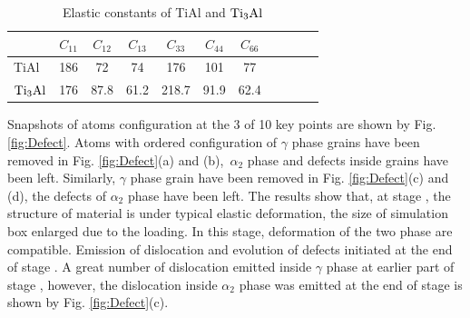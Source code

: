 \documentclass[materials,article,submit,moreauthors,pdftex,10pt,a4paper]{Definitions/mdpi}
\begin{document}
\begin{table}[ht]
	\caption{Elastic constants of TiAl and $\rm{Ti_3Al}$}
	\centering
	\begin{tabular}{l c c c c c c c c c c}
		\toprule
		\textbf{ } &$C_{11}$ &$C_{12}$ &$C_{13}$ &$C_{33}$ &$C_{44}$ &$C_{66}$\\		 
		\midrule
		TiAl\cite{Schwarz1995} &186 &72 &74 & 176 &101 &77	 \\
		\midrule
		$\rm{Ti_3Al}$\cite{Tanaka1996}	& 176 &  87.8 & 61.2 & 218.7 & 91.9 & 62.4   \\
		\bottomrule
	\end{tabular} 
	\label{tab:elastic}
\end{table}
Snapshots of atoms configuration at the 3 of 10 key points are shown by Fig. \ref{fig:Defect}.  Atoms with ordered configuration  of $\gamma$ phase grains have been removed in Fig. \ref{fig:Defect}(a) and (b),\ $\alpha_2$ phase and defects inside grains have been left. Similarly, $\gamma$ phase grain have been removed in Fig. \ref{fig:Defect}(c) and (d), the defects of $\alpha_2$ phase have been left.  The results show that, at stage \uppercase\expandafter{}, the structure of material is under typical elastic deformation, the size of simulation box enlarged due to the loading. In this stage, deformation of the two phase are compatible. Emission of dislocation and evolution of defects initiated at the end of stage \uppercase\expandafter{}. A  great number of dislocation emitted inside $\gamma$ phase at earlier part of stage \uppercase\expandafter{}, however, the dislocation inside $\alpha_2$ phase was emitted at the end of stage \uppercase\expandafter{} is shown by Fig. \ref{fig:Defect}(c).  
\end{document}
